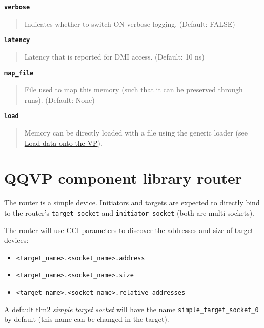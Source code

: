 {\textbf {\footnotesize{\lstinline!verbose!}}}
\vspace{-2pt}
\begin{quote}
Indicates whether to switch ON verbose logging. (Default: FALSE)
\end{quote}


{\textbf {\footnotesize{\lstinline!latency!}}}
\vspace{-2pt}
\begin{quote}
Latency that is reported for DMI access. (Default: 10 ns)
\end{quote}


{\textbf {\footnotesize{\lstinline!map_file!}}}
\vspace{-2pt}
\begin{quote}
File used to map this memory (such that it can be preserved through runs). (Default: None)
\end{quote}


{\textbf {\footnotesize{\lstinline!load!}}}
\vspace{-2pt}
\begin{quote}
Memory can be directly loaded with a file using the generic loader (see \hyperref[sec:load-data-on-vp]{Load data onto the VP}).
\end{quote}


\section{QQVP component library router}

The router is a simple device. Initiators and targets are expected to directly bind to the router's {\small{\lstinline!target_socket!}} and {\small{\lstinline!initiator_socket!}} (both are multi-sockets).

The router will use CCI parameters to discover the addresses and size of target devices:

\begin{itemize}
\item {\small{\lstinline!<target_name>.<socket_name>.address!}}
\item {\small{\lstinline!<target_name>.<socket_name>.size!}}
\item {\small{\lstinline!<target_name>.<socket_name>.relative_addresses!}}
\end{itemize}

A default tlm2 \emph{simple target socket} will have the name {\small{\lstinline!simple_target_socket_0!}} by default (this name can be changed in the target).

